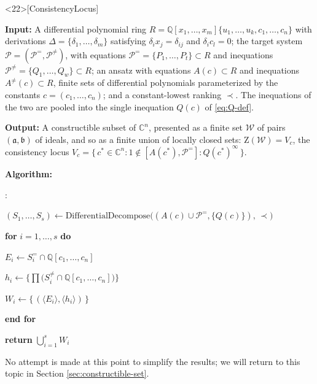\documentclass{article}
\theoremstyle{definition}
\theoremstyle{plain}
\newcounter{algline}
\newenvironment{pseudocode}
  {\begin{list}{\arabic{algline}:}%
     {\usecounter{algline}%
      \setlength{\leftmargin}{2.4em}\setlength{\labelwidth}{1.5em}%
      \setlength{\labelsep}{0.5em}\setlength{\itemsep}{1pt}%
      \setlength{\parsep}{0pt}\setlength{\topsep}{5pt}}}
  {\end{list}}
\newcommand{\algind}{\hspace*{1.3em}}
\begin{document}
\begin{algorithm}<22>[ConsistencyLocus]
\label{alg:consistency-basic}
\mbox{}

{\bf Input:} A differential polynomial ring
$R = \mathbb{Q}[x_1, \ldots, x_m]\{u_1, \ldots, u_k, c_1, \ldots, c_n\}$ with
derivations $\Delta = \{\delta_1, \ldots, \delta_m\}$ satisfying
$\delta_i x_j = \delta_{ij}$ and $\delta_i c_l = 0$; the target system
$\mathcal{P} = (\mathcal{P}^=, \mathcal{P}^{\ne})$, with equations
$\mathcal{P}^= = \{P_1, \ldots, P_t\} \subset R$ and inequations
$\mathcal{P}^{\ne} = \{Q_1, \ldots, Q_w\} \subset R$; an
ansatz with equations $A(c) \subset R$ and inequations $A^{\ne}(c) \subset R$,
finite sets of differential
polynomials parameterized by the constants $c = (c_1, \ldots, c_n)$;
and a constant-lowest ranking $\prec$.
The inequations of the two are pooled into the single inequation $Q(c)$ of
\eqref{eq:Q-def}.


{\bf Output:} A constructible subset of $\mathbb{C}^n$, presented as a finite
set $\mathcal{W}$ of pairs $(\mathfrak{a}, \mathfrak{b})$ of ideals,
and so as a finite union of locally
closed sets: $\mathrm{Z}(\mathcal{W}) = V_c$, the consistency locus
$V_c = \{\, c^* \in \mathbb{C}^n : 1 \notin [A(c^*), \mathcal{P}^=] : Q(c^*)^\infty \,\}$.

{\bf Algorithm:}
\begin{pseudocode}
\item $(S_1, \ldots, S_s) \leftarrow \mathrm{DifferentialDecompose}\bigl( (A(c) \cup \mathcal{P}^=, \{Q(c)\}), \, \prec \bigr)$
\item {\bf for} $i = 1, \ldots, s$ {\bf do}
\item \algind $E_i \leftarrow S^=_i \cap \mathbb{Q}[c_1, \ldots, c_n]$
\item \algind $h_i \leftarrow \bigl\{ \prod \bigl( S^{\ne}_i \cap \mathbb{Q}[c_1, \ldots, c_n] \bigr) \bigr\}$
\item \algind $W_i \leftarrow \bigl\{\, (\langle E_i \rangle, \langle h_i \rangle) \,\bigr\}$
\item {\bf end for}
\item {\bf return} $\textstyle\bigcup_{i=1}^{s} W_i$
\end{pseudocode}
\end{algorithm}

No attempt is made at this point to simplify the results; we will return
to this topic in Section \ref{sec:constructible-set}.
\end{document}
